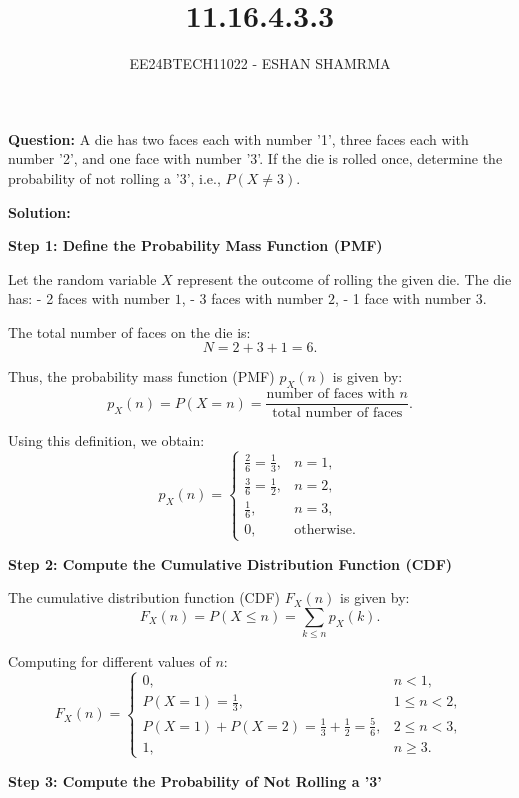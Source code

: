 \documentclass[journal]{IEEEtran}
\begin{document}
	
	
	\vspace{3cm}
	
	\title{11.16.4.3.3}
	\author{EE24BTECH11022 - ESHAN SHAMRMA}
	\maketitle
	\textbf{Question:}
	A die has two faces each with number '1', three faces each with number '2', and one face with number '3'. If the die is rolled once, determine the probability of not rolling a '3', i.e., \( P(X \neq 3) \).
	
	\textbf{Solution:}
	
	\textbf{Step 1: Define the Probability Mass Function (PMF)}
	
	Let the random variable \( X \) represent the outcome of rolling the given die. The die has:
	- 2 faces with number \( 1 \),
	- 3 faces with number \( 2 \),
	- 1 face with number \( 3 \).
	
	The total number of faces on the die is:
	\[
	N = 2 + 3 + 1 = 6.
	\]
	
	Thus, the probability mass function (PMF) \( p_X(n) \) is given by:
	\[
	p_X(n) = P(X = n) = \frac{\text{number of faces with } n}{\text{total number of faces}}.
	\]
	
	Using this definition, we obtain:
	\[
	p_X(n) =
	\begin{cases}
		\frac{2}{6} = \frac{1}{3}, & n = 1, \\
		\frac{3}{6} = \frac{1}{2}, & n = 2, \\
		\frac{1}{6}, & n = 3, \\
		0, & \text{otherwise}.
	\end{cases}
	\]
	
	\textbf{Step 2: Compute the Cumulative Distribution Function (CDF)}
	
	The cumulative distribution function (CDF) \( F_X(n) \) is given by:
	\[
	F_X(n) = P(X \leq n) = \sum_{k \leq n} p_X(k).
	\]
	
	Computing for different values of \( n \):
	\[
	F_X(n) =
	\begin{cases}
		0, & n < 1, \\
		P(X = 1) = \frac{1}{3}, & 1 \leq n < 2, \\
		P(X = 1) + P(X = 2) = \frac{1}{3} + \frac{1}{2} = \frac{5}{6}, & 2 \leq n < 3, \\
		1, & n \geq 3.
	\end{cases}
	\]
	
	\textbf{Step 3: Compute the Probability of Not Rolling a '3'}
	
\end{document}
